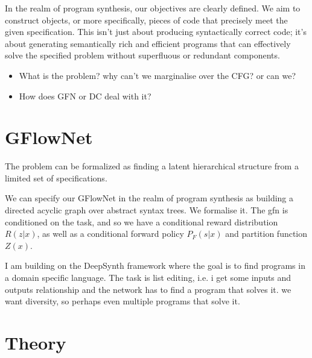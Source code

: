 In the realm of program synthesis, our objectives are clearly defined. We aim to construct objects, or more specifically, pieces of code that precisely meet the given specification. This isn't just about producing syntactically correct code; it's about generating semantically rich and efficient programs that can effectively solve the specified problem without superfluous or redundant components.







\begin{itemize}
    \item What is the problem? why can't we marginalise over the CFG? or can we? 
    \item How does GFN or DC deal with it? 
\end{itemize}












\section{GFlowNet}
The problem can be formalized as finding a latent hierarchical structure from a limited set of specifications.

We can specify our GFlowNet in the realm of program synthesis as building a directed acyclic graph over abstract syntax trees.
We formalise it. 
The gfn is conditioned on the task, and so we have a conditional reward distribution $R(z|x)$, as well as a conditional forward policy $P_F(s|x)$ and partition function $Z(x)$.

I am building on the DeepSynth framework where the goal is to find programs in a domain specific language. 
The task is list editing, i.e. i get some inputs and outputs relationship and the network has to find a program that solves it. 
we want diversity, so perhaps even multiple programs that solve it.

\section{Theory}

